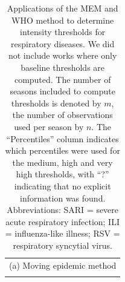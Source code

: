 \documentclass{article}
\begin{document}
\begin{table}[h!]
\caption{Applications of the MEM and WHO method to determine intensity thresholds for respiratory diseases. We did not include works where only baseline thresholds are computed. The number of seasons included to compute thresholds is denoted by $m$, the number of observations used per season by $n$. The ``Percentiles'' column indicates which percentiles were used for the medium, high and very high thresholds, with ``?'' indicating that no explicit information was found. Abbreviations: SARI = severe acute respiratory infection; ILI = influenza-like illness; RSV = respiratory syncytial virus.}
\label{tab:literature}
\center
\footnotesize
\begin{tabular}{l l l l l l l}
\multicolumn{7}{c}{(a) Moving epidemic method}\\ \\


\end{tabular}
\end{table}
\end{document}
